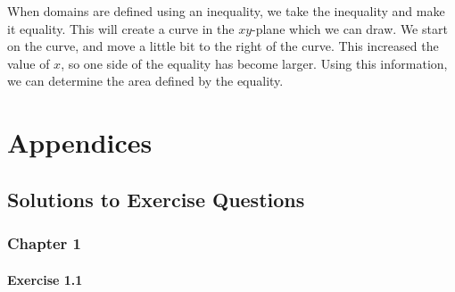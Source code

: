 \documentclass[11pt,fleqn]{book} %
\begin{document}
When domains are defined using an inequality, we take the inequality and make it equality. This will create a curve in the $xy$-plane which we can draw. We start on the curve, and move a little bit to the right of the curve. This increased the value of $x$, so one side of the equality has become larger. Using this information, we can determine the area defined by the equality.

\begin{example}
    
\end{example}


\part{Appendices}


\chapter*{Solutions to Exercise Questions}
\setlength{\parindent}{0pt} %

\section*{Chapter 1}

\subsection*{Exercise 1.1}
\end{document}
